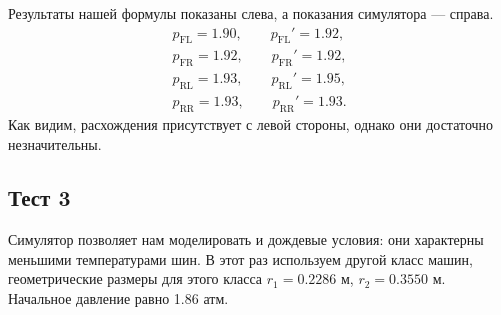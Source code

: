 \documentclass[a4paper,12pt]{report}
\begin{document}
        Результаты нашей формулы показаны слева, а показания симулятора --- справа.
        \begin{gather*}
            p_\text{FL}=1.90, \qquad p_\text{FL}'=1.92,\\
            p_\text{FR}=1.92, \qquad p_\text{FR}'=1.92,\\
            p_\text{RL}=1.93, \qquad p_\text{RL}'=1.95,\\
            p_\text{RR}=1.93, \qquad p_\text{RR}'=1.93.
        \end{gather*}
        Как видим, расхождения присутствует с левой стороны, однако они достаточно незначительны.

    \subsection{Тест 3}
        Симулятор позволяет нам моделировать и дождевые условия: они характерны меньшими температурами шин. В этот раз используем другой класс машин, геометрические размеры для этого класса $r_1=0.2286$ м, $r_2=0.3550$ м. Начальное давление равно 1.86 атм.
\end{document}
